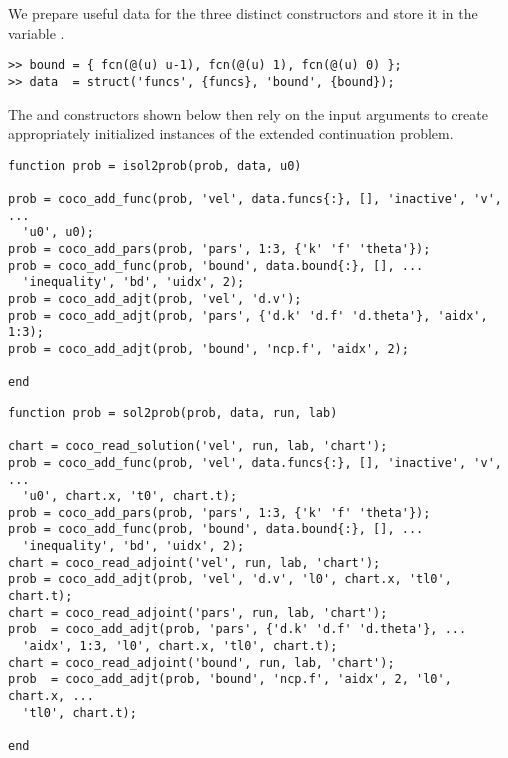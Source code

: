 We prepare useful data for the three distinct constructors and store it in the variable .
\begin{lstlisting}[language=coco-highlight]
>> bound = { fcn(@(u) u-1), fcn(@(u) 1), fcn(@(u) 0) };
>> data  = struct('funcs', {funcs}, 'bound', {bound});
\end{lstlisting}
The  and  constructors shown below then rely on the input arguments to create appropriately initialized instances of the extended continuation problem.
\begin{lstlisting}[language=coco-highlight]
function prob = isol2prob(prob, data, u0)

prob = coco_add_func(prob, 'vel', data.funcs{:}, [], 'inactive', 'v', ...
  'u0', u0);
prob = coco_add_pars(prob, 'pars', 1:3, {'k' 'f' 'theta'});
prob = coco_add_func(prob, 'bound', data.bound{:}, [], ...
  'inequality', 'bd', 'uidx', 2);
prob = coco_add_adjt(prob, 'vel', 'd.v');
prob = coco_add_adjt(prob, 'pars', {'d.k' 'd.f' 'd.theta'}, 'aidx', 1:3);
prob = coco_add_adjt(prob, 'bound', 'ncp.f', 'aidx', 2);

end
\end{lstlisting}
\begin{lstlisting}[language=coco-highlight]
function prob = sol2prob(prob, data, run, lab)

chart = coco_read_solution('vel', run, lab, 'chart');
prob = coco_add_func(prob, 'vel', data.funcs{:}, [], 'inactive', 'v', ...
  'u0', chart.x, 't0', chart.t);
prob = coco_add_pars(prob, 'pars', 1:3, {'k' 'f' 'theta'});
prob = coco_add_func(prob, 'bound', data.bound{:}, [], ...
  'inequality', 'bd', 'uidx', 2);
chart = coco_read_adjoint('vel', run, lab, 'chart');
prob = coco_add_adjt(prob, 'vel', 'd.v', 'l0', chart.x, 'tl0', chart.t);
chart = coco_read_adjoint('pars', run, lab, 'chart');
prob  = coco_add_adjt(prob, 'pars', {'d.k' 'd.f' 'd.theta'}, ...
  'aidx', 1:3, 'l0', chart.x, 'tl0', chart.t);
chart = coco_read_adjoint('bound', run, lab, 'chart');
prob  = coco_add_adjt(prob, 'bound', 'ncp.f', 'aidx', 2, 'l0', chart.x, ...
  'tl0', chart.t);
  
end
\end{lstlisting}

